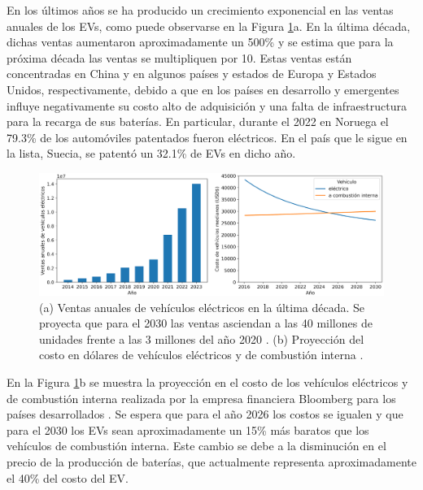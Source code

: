 En los últimos años se ha producido un crecimiento exponencial en las ventas 
anuales de los EVs, como puede observarse en la Figura \ref{fig:evs}a. En la
última década, dichas ventas aumentaron aproximadamente un 500\% y se estima que
para la próxima década las ventas se multipliquen por 10. Estas ventas están 
concentradas en China y en algunos países y estados de Europa y Estados Unidos, 
respectivamente, debido a que en los países en desarrollo y emergentes influye 
negativamente su costo alto de adquisición y una falta de infraestructura para la 
recarga de sus baterías. En particular, durante el 2022 en Noruega el 79.3\% de 
los automóviles patentados fueron eléctricos. En el país que le sigue en la lista,
Suecia, se patentó un 32.1\% de EVs en dicho año.
\begin{figure}[h!]
    \centering
    \includegraphics[width=\textwidth]{Introduccion/energia/evs.png}
    \caption{(a) Ventas anuales de vehículos eléctricos en la última década. Se 
    proyecta que para el 2030 las ventas asciendan a las 40 millones de unidades 
    frente a las 3 millones del año 2020 \cite{EVV}. (b) Proyección del costo en 
    dólares de vehículos eléctricos y de combustión interna \cite{BLOOMBERG}.}
    \label{fig:evs}
\end{figure}

En la Figura \ref{fig:evs}b se muestra la proyección en el costo de los vehículos 
eléctricos y de combustión interna realizada por la empresa financiera Bloomberg 
para los países desarrollados \cite{BLOOMBERG}. Se espera que para el año 2026 
los costos se igualen y que para el 2030 los EVs sean aproximadamente un 15\% más
baratos que los vehículos de combustión interna. Este cambio se debe a la 
disminución en el precio de la producción de baterías, que actualmente representa
aproximadamente el 40\% del costo del EV.

